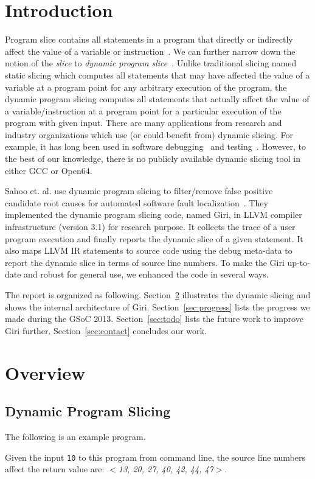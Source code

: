 \documentclass[DIV=calc, paper=a4, fontsize=11pt, twocolumn]{scrartcl}
\begin{document}
\section{Introduction}
Program slice contains all statements in a program that directly or indirectly affect the value of a variable or instruction~\cite{weiser}.
We can further narrow down the notion of the \emph{slice} to \emph{dynamic program slice}~\cite{agrawal1990dynamic}.
Unlike traditional slicing named static slicing which computes all statements that may have affected the value of a variable at a program point for any arbitrary execution of the program,
the dynamic program slicing computes all statements that actually affect the value of a variable/instruction at a program point for a particular execution of the program with given input.
There are many applications from research and industry organizations which use (or could benefit from) dynamic slicing.
For example, it has long been used in software debugging~\cite{1993debugging,1999efficient} and testing~\cite{1993incremental}.
However, to the best of our knowledge, there is no publicly available dynamic slicing tool in either GCC or Open64.

Sahoo et. al. use dynamic program slicing to filter/remove false positive candidate root causes for automated software fault localization~\cite{sahoo2013asplos}.
They implemented the dynamic program slicing code, named Giri, in LLVM compiler infrastructure (version 3.1) for research purpose.
It collects the trace of a user program execution and finally reports the dynamic slice of a given statement.
It also maps LLVM IR statements to source code using the debug meta-data to report the dynamic slice in terms of source line numbers.
To make the Giri up-to-date and robust for general use, we enhanced the code in several ways.

The report is organized as following.
Section~\ref{sec:overview} illustrates the dynamic slicing and shows the internal architecture of Giri.
Section~\ref{sec:progress} lists the progress we made during the GSoC 2013.
Section~\ref{sec:todo} lists the future work to improve Giri further.
Section~\ref{sec:contact} concludes our work.

\section{Overview}
\label{sec:overview}
\subsection{Dynamic Program Slicing}
The following is an example program.

Given the input \texttt{10} to this program from command line,
the source line numbers affect the return value are: $<$\emph{13, 20, 27, 40, 42, 44, 47}$>$.
\end{document}
